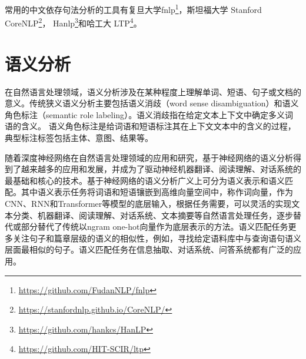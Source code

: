 常用的中文依存句法分析的工具有复旦大学fnlp\footnote{\url{https://github.com/FudanNLP/fnlp}}，斯坦福大学 Stanford CoreNLP\footnote{\url{https://stanfordnlp.github.io/CoreNLP/}}， Hanlp\footnote{\url{https://github.com/hankcs/HanLP}}和哈工大 LTP\footnote{\url{https://github.com/HIT-SCIR/ltp}}。





\section{语义分析}
在自然语言处理领域，语义分析涉及在某种程度上理解单词、短语、句子或文档的意义。传统狭义语义分析主要包括语义消歧（word sense disambiguation）\cite{ yarowsky1995unsupervised}和语义角色标注（semantic role labeling）\cite{ carreras2005introduction, bjorkelund2009multilingual}。语义消歧指在给定文本上下文中确定多义词语的含义。
语义角色标注是给词语和短语标注其在上下文文本中的含义的过程，典型标注标签包括主体、意图、结果等。


随着深度神经网络在自然语言处理领域的应用和研究，基于神经网络的语义分析得到了越来越多的应用和发展，并成为了驱动神经机器翻译\cite{ bahdanau2014neural, luong2015effective}、阅读理解\cite{ hermann2015teaching}、对话系统\cite{ serban2016building, chen2017survey}的最基础和核心的技术。基于神经网络的语义分析广义上可分为语义表示和语义匹配。其中语义表示任务将词语和短语镶嵌到高维向量空间中，称作词向量，作为CNN\cite{ lecun1995convolutional}、RNN\cite{ hochreiter1997long}和Transformer\cite{ vaswani2017attention}等模型的底层输入，根据任务需要，可以灵活的实现文本分类\cite{ joulin2016bag, zhang2015character}、机器翻译、阅读理解、对话系统、文本摘要\cite{ tan2017abstractive, yao2017recent}等自然语言处理任务，逐步替代或部分替代了传统以ngram one-hot向量作为底层表示的方法。语义匹配任务更多关注句子和篇章层级的语义的相似性，例如，寻找给定语料库中与查询语句语义层面最相似的句子。语义匹配任务在信息抽取、对话系统、问答系统都有广泛的应用。

